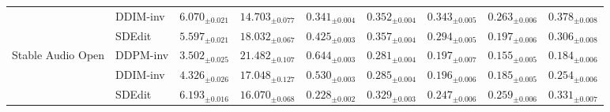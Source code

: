 \begin{table}[t]
\begin{tabular}{ll ccc cccc}
      & DDIM-inv & $6.070_{\pm 0.021}$ & $14.703_{\pm 0.077}$ & $0.341_{\pm 0.004}$ & $0.352_{\pm 0.004}$ & $\mathbf{0.343}_{\pm 0.005}$ & $\mathbf{0.263}_{\pm 0.006}$ & $\mathbf{0.378}_{\pm 0.008}$ \\
      & SDEdit   & $5.597_{\pm 0.021}$ & $18.032_{\pm 0.067}$ & $0.425_{\pm 0.003}$ & $\mathbf{0.357}_{\pm 0.004}$ & $0.294_{\pm 0.005}$ & $0.197_{\pm 0.006}$ & $0.306_{\pm 0.008}$ \\
    \midrule
    \multirow{3}{*}{Stable Audio Open}
      & DDPM-inv & $\mathbf{3.502}_{\pm 0.025}$ & $\mathbf{21.482}_{\pm 0.107}$ & $\mathbf{0.644}_{\pm 0.003}$ & $0.281_{\pm 0.004}$ & $0.197_{\pm 0.007}$ & $0.155_{\pm 0.005}$ & $0.184_{\pm 0.006}$ \\
      & DDIM-inv & $4.326_{\pm 0.026}$ & $17.048_{\pm 0.127}$ & $0.530_{\pm 0.003}$ & $0.285_{\pm 0.004}$ & $0.196_{\pm 0.006}$ & $0.185_{\pm 0.005}$ & $0.254_{\pm 0.006}$ \\
      & SDEdit   & $6.193_{\pm 0.016}$ & $16.070_{\pm 0.068}$ & $0.228_{\pm 0.002}$ & $\mathbf{0.329}_{\pm 0.003}$ & $\mathbf{0.247}_{\pm 0.006}$ & $\mathbf{0.259}_{\pm 0.006}$ & $\mathbf{0.331}_{\pm 0.007}$ \\
    \bottomrule
  \end{tabular}
\end{table}

